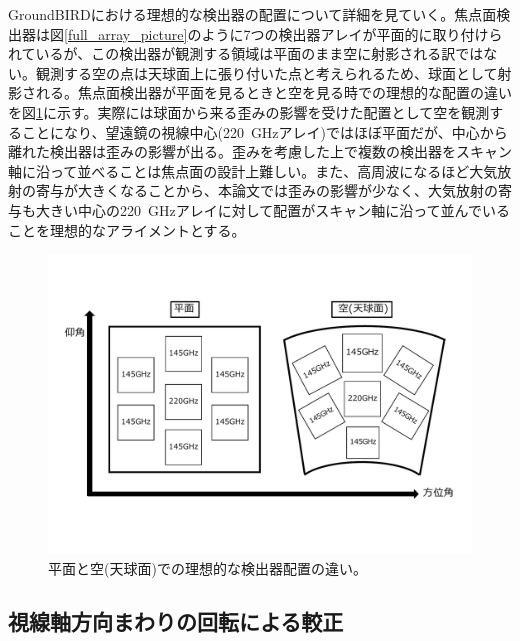 GroundBIRDにおける理想的な検出器の配置について詳細を見ていく。焦点面検出器は図\ref{full_array_picture}のように7つの検出器アレイが平面的に取り付けられているが、この検出器が観測する領域は平面のまま空に射影される訳ではない。観測する空の点は天球面上に張り付いた点と考えられるため、球面として射影される。焦点面検出器が平面を見るときと空を見る時での理想的な配置の違いを図\ref{distortion_pos}に示す。実際には球面から来る歪みの影響を受けた配置として空を観測することになり、望遠鏡の視線中心(\SI{220}{GHz}アレイ)ではほぼ平面だが、中心から離れた検出器は歪みの影響が出る。歪みを考慮した上で複数の検出器をスキャン軸に沿って並べることは焦点面の設計上難しい。また、高周波になるほど大気放射の寄与が大きくなる\cite{atmos_radiation}ことから、本論文では歪みの影響が少なく、大気放射の寄与も大きい中心の\SI{220}{GHz}アレイに対して配置がスキャン軸に沿って並んでいることを理想的なアライメントとする。
\begin{figure}[htbp]
  \centering
  \includegraphics[width=0.8\columnwidth]{5_alignment/figs/distortion_pos2.pdf}
  \caption{平面と空(天球面)での理想的な検出器配置の違い。}
  \label{distortion_pos}
\end{figure}
\subsection{視線軸方向まわりの回転による較正}

